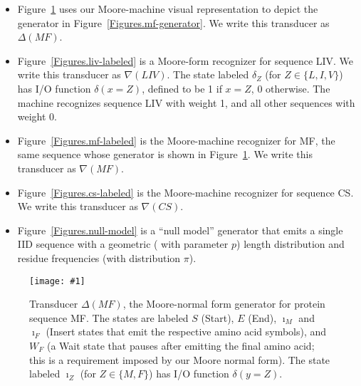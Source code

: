 \documentclass{article}
\newcommand{\figref}[1]{Figure~\ref{Figures.#1}}
\newcommand{\figlabel}[1]{\label{Figures.#1}}
\newcommand{\easyfig}[4]{
\begin{figure}
\texttt{[image: \#1]}
\caption{ \figlabel{#3} #4}
\end{figure}}
\newcommand{\pdffig}[2]{\easyfig{#1-fig.pdf}{}{#1}{#2}}
\newcommand\generate{\Delta}
\newcommand\recognize{\nabla}
\begin{document}
\begin{itemize}

\item \figref{moore-mf-generator} uses our Moore-machine visual representation
to depict the generator in \figref{mf-generator}.
We write this transducer as $\generate(MF)$.

\item \figref{liv-labeled} is a Moore-form recognizer for sequence LIV.
We write this transducer as $\recognize(LIV)$.
The state labeled $\delta_Z$  (for $Z \in \{L,I,V\}$) has I/O function $\delta(x=Z)$,
defined to be 1 if $x=Z$, 0 otherwise.
The machine recognizes sequence LIV with weight 1, and all other sequences with weight 0. 

\item \figref{mf-labeled} is the Moore-machine recognizer for MF,
the same sequence whose generator is shown in \figref{moore-mf-generator}.
We write this transducer as $\recognize(MF)$.

\item \figref{cs-labeled} is the Moore-machine recognizer for sequence CS.
We write this transducer as $\recognize(CS)$.

\item \figref{null-model} is a ``null model'' generator that emits a single IID sequence
with a geometric ( with parameter $p$) length distribution and residue frequencies
 (with distribution $\pi$).  

\end{itemize}




\pdffig{moore-mf-generator}{Transducer $\generate(MF)$, the Moore-normal form generator for protein sequence MF.
The states are labeled $S$ (Start), $E$ (End),
$\imath_M$ and $\imath_F$ (Insert states that emit the respective amino acid symbols),
and $W_F$ (a Wait state that pauses after emitting the final amino acid;
this is a requirement imposed by our Moore normal form).
The state labeled $\imath_Z$ (for $Z \in \{M,F\}$) has I/O function $\delta(y=Z)$.}
\end{document}
